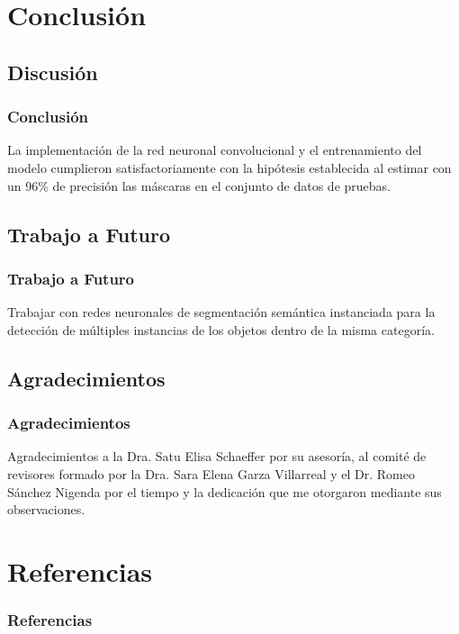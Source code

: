 \documentclass{beamer}
\begin{document}
\section{Conclusión}
\subsection{Discusión}
\begin{frame}
    \frametitle{Conclusión}
    La implementación de la red neuronal convolucional y el entrenamiento del modelo cumplieron satisfactoriamente con la hipótesis establecida al estimar con un 96\% de precisión las máscaras en el conjunto de datos de pruebas.
\end{frame}

\subsection{Trabajo a Futuro}
\begin{frame}
    \frametitle{Trabajo a Futuro}
    Trabajar con redes neuronales de segmentación semántica instanciada para la detección de múltiples instancias de los objetos dentro de la misma categoría. 
\end{frame}

\subsection{Agradecimientos}
\begin{frame}
    \frametitle{Agradecimientos}
    Agradecimientos a la Dra. Satu Elisa Schaeffer por su asesoría, al comité de revisores formado por la Dra. Sara Elena Garza Villarreal y el Dr. Romeo Sánchez Nigenda por el tiempo y la dedicación que me otorgaron mediante sus observaciones.
\end{frame}

\section{Referencias}
\begin{frame}[allowframebreaks]
    \footnotesize
    \nocite{adam_opt}
    \frametitle{Referencias}
    
    
    
    
\end{frame}
\end{document}
